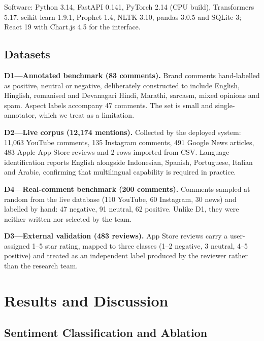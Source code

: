 \documentclass[conference]{IEEEtran}
\begin{document}
Software: Python 3.14, FastAPI 0.141, PyTorch 2.14 (CPU build), Transformers 5.17,
scikit-learn 1.9.1, Prophet 1.4, NLTK 3.10, pandas 3.0.5 and SQLite 3; React 19 with
Chart.js 4.5 for the interface.

\subsection{Datasets}

\textbf{D1---Annotated benchmark (83 comments).} Brand comments hand-labelled as
positive, neutral or negative, deliberately constructed to include English, Hinglish,
romanised and Devanagari Hindi, Marathi, sarcasm, mixed opinions and spam. Aspect labels
accompany 47 comments. The set is small and single-annotator, which we treat as a
limitation.

\textbf{D2---Live corpus (12{,}174 mentions).} Collected by the deployed system: 11{,}063
YouTube comments, 135 Instagram comments, 491 Google News articles, 483 Apple App Store
reviews and 2 rows imported from CSV. Language identification reports English alongside
Indonesian, Spanish, Portuguese, Italian and Arabic, confirming that multilingual
capability is required in practice.

\textbf{D4---Real-comment benchmark (200 comments).} Comments sampled at random from the live
database (110 YouTube, 60 Instagram, 30 news) and labelled by hand: 47 negative, 91 neutral,
62 positive. Unlike D1, they were neither written nor selected by the team.

\textbf{D3---External validation (483 reviews).} App Store reviews carry a user-assigned
1--5 star rating, mapped to three classes (1--2 negative, 3 neutral, 4--5 positive) and
treated as an independent label produced by the reviewer rather than the research team.

\section{Results and Discussion}

\subsection{Sentiment Classification and Ablation}
\end{document}

